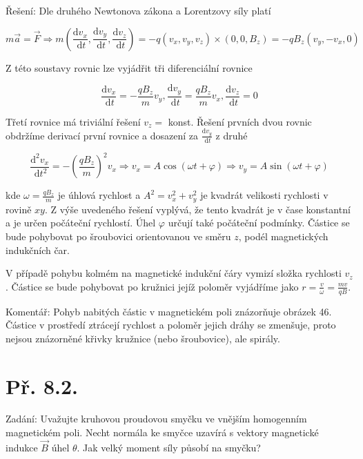 \documentclass[czech,11pt,a4paper]{article}
\begin{document}
Řešení: Dle druhého Newtonova zákona a Lorentzovy síly platí

$$
m \vec{a}=\vec{F} \Rightarrow m\left(\frac{\mathrm{d} v_{x}}{\mathrm{~d} t}, \frac{\mathrm{d} v_{y}}{\mathrm{~d} t}, \frac{\mathrm{d} v_{z}}{\mathrm{~d} t}\right)=-q\left(v_{x}, v_{y}, v_{z}\right) \times\left(0,0, B_{z}\right)=-q B_{z}\left(v_{y},-v_{x}, 0\right)
$$

Z této soustavy rovnic lze vyjádřit tři diferenciální rovnice

$$
\frac{\mathrm{d} v_{x}}{\mathrm{~d} t}=-\frac{q B_{z}}{m} v_{y}, \frac{\mathrm{d} v_{y}}{\mathrm{~d} t}=\frac{q B_{z}}{m} v_{x}, \frac{\mathrm{d} v_{z}}{\mathrm{~d} t}=0
$$

Třetí rovnice má triviální řešení $v_{z}=$ konst. Řešení prvních dvou rovnic obdržíme derivací první rovnice a dosazení za $\frac{\mathrm{d} v_{y}}{\mathrm{~d} t}$ z druhé

$$
\frac{\mathrm{d}^{2} v_{x}}{\mathrm{~d} t^{2}}=-\left(\frac{q B_{z}}{m}\right)^{2} v_{x} \Rightarrow v_{x}=A \cos (\omega t+\varphi) \Rightarrow v_{y}=A \sin (\omega t+\varphi)
$$

kde $\omega=\frac{q B_{z}}{m}$ je úhlová rychlost a $A^{2}=v_{x}^{2}+v_{y}^{2}$ je kvadrát velikosti rychlosti v rovině $x y$. Z výše uvedeného řešení vyplývá, že tento kvadrát je v čase konstantní a je určen počáteční rychlostí. Úhel $\varphi$ určují také počáteční podmínky. Částice se bude pohybovat po šroubovici orientovanou ve směru $z$, podél magnetických indukčních čar.

V případě pohybu kolmém na magnetické indukční čáry vymizí složka rychlosti $v_{z}$. Částice se bude pohybovat po kružnici jejíž poloměr vyjádříme jako $r=\frac{v}{\omega}=\frac{m v}{q B}$.

Komentář: Pohyb nabitých částic v magnetickém poli znázorňuje obrázek 46. Částice v prostředí ztrácejí rychlost a poloměr jejich dráhy se zmenšuje, proto nejsou znázorněné křivky kružnice (nebo šroubovice), ale spirály.

\section{Př. 8.2.}

Zadání: Uvažujte kruhovou proudovou smyčku ve vnějším homogenním magnetickém poli. Necht normála ke smyčce uzavírá s vektory magnetické indukce $\vec{B}$ úhel $\theta$. Jak velký moment síly působí na smyčku?
\end{document}
